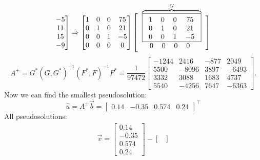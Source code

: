 \documentclass[12pt]{report}
\begin{document}
\begin{solution}
\[\begin{matrix}
                -5 \\
                11 \\
                15 \\
                -9
            \end{matrix}\Vast] 
        \Rightarrow \begin{bmatrix}
         1 & 0 & 0 & 75 \\
         0 & 1 & 0 & 21 \\
         0 & 0 & 1 & -5 \\
         0 & 0 & 0 & 0
       \end{bmatrix}
       \VVast[\begin{tabular}{c} \\[-1cm]
         $\overbrace{\fbox{\begin{tabular}{cccc}
            $1$ & $0$ & $0$ & $75$\\
            $0$ & $1$ & $0$ & $21$ \\
            $0$ & $0$ & $1$ & $-5$\\ [-0.1cm]
         \end{tabular}}}^G$ \\
         \hspace*{-0.3cm} \begin{tabular}{cccc}
            $0$ & $0$ & $0$ & $0$
         \end{tabular}
         \end{tabular}\Vast]
   \]
   \[
   A^+ = G^*\left(G, G^*\right)^{-1}(F^*, F)^{-1}F^* = \dfrac{1}{97472} \begin{bmatrix}
      -1244 & 2416 & -877 & 2049 \\
      5500 & -8096 & 3897 & -6493 \\
      3332 & 3088 & 1683 & 4737 \\
      5540 & -4256 & 7647 & -6363
   \end{bmatrix}.
   \]
   Now we can find the smallest pseudosolution:
   \[
      \hat{u} = A^+ \vec{b} = \begin{bmatrix}
         0.14 & -0.35 & 0.574 & 0.24
      \end{bmatrix}^\intercal
   \]
   All pseudosolutions:
   \[
      \begin{array}{c}
         \displaystyle 
         \vec{v} =  \begin{bmatrix}
            0.14 \\ -0.35 \\ 0.574 \\ 0.24
         \end{bmatrix} - \begin{bmatrix}

\end{bmatrix}
\end{array}\]
\end{solution}
\end{document}

